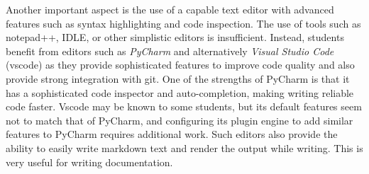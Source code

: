 \documentclass[utf8]{FrontiersinVancouver} %
\begin{document}
Another important aspect is the use of a capable text editor with
advanced features such as syntax highlighting and code inspection. The
use of tools such as notepad++, IDLE, or other simplistic editors is
insufficient. Instead, students benefit from editors such as {\em
  PyCharm} and alternatively {\em Visual Studio Code} (vscode) as they
provide sophisticated features to improve code quality and also
provide strong integration with git. One of the strengths of PyCharm
is that it has a sophisticated code inspector and auto-completion,
making writing reliable code faster. Vscode may be known to some
students, but its default features seem not to match that of PyCharm,
and configuring its plugin engine to add similar features to PyCharm
requires additional work. Such editors also provide the ability to
easily write markdown text and render the output while writing. This
is very useful for writing documentation.
\end{document}

